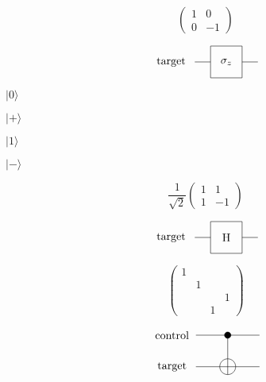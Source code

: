 \documentclass{article}
\begin{document}
\[
\begin{pmatrix}
1 & 0 \\
0 & -1
\end{pmatrix}
\]
\pagebreak

\[
             \begin{tikzpicture}[scale=.5]
             \node[draw=none] at (-3.5, 0) {target};

             \draw (-2,0) -- (-1, 0);
             \draw (1, 0) -- (2, 0);
             \draw (-1,-1)--(-1,1)--(1,1)--(1,-1)--cycle;
             \node[draw=none] at (0, 0) {$\sigma_z$};
             \end{tikzpicture}
 \]
\pagebreak

$|0\rangle$
\pagebreak

$|+\rangle$
\pagebreak

$|1\rangle$
\pagebreak

$|-\rangle$
\pagebreak

\[
\frac{1}{\sqrt{2}}
\begin{pmatrix}
1 & 1 \\
1 & -1
\end{pmatrix}
\]
\pagebreak

\[
             \begin{tikzpicture}[scale=.5]
             \node[draw=none] at (-3.5, 0) {target};

             \draw (-2,0) -- (-1, 0);
             \draw (1, 0) -- (2, 0);
             \draw (-1,-1)--(-1,1)--(1,1)--(1,-1)--cycle;
             \node[draw=none] at (0, 0) {H};
             \end{tikzpicture}
 \]
\pagebreak

\[
\begin{pmatrix}
1 \\
& 1 \\\
& & & 1 \\
& & 1
\end{pmatrix}
\]
\pagebreak

\[
             \begin{tikzpicture}[scale=.5]
             \node[draw=none] at (-3.5, 2) {control};
             \node[draw=none] at (-3.5, 0) {target};

             \draw (-2, 2) -- (2, 2);
             \draw[fill=black] (0, 2) circle (.2);
             \draw (0, 2) -- (0, -.5);
             
             \draw (-2,0) -- (2, 0);
             \draw (0, 0) circle (.5);
             \end{tikzpicture}
 \]
\pagebreak
\end{document}
